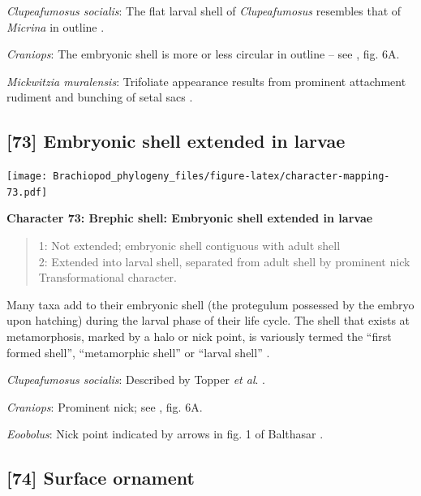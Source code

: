 \documentclass[]{book}
\theoremstyle{definition}
\theoremstyle{definition}
\theoremstyle{definition}
\theoremstyle{remark}
\begin{document}
\emph{Clupeafumosus socialis}: The flat larval shell of
\emph{Clupeafumosus} resembles that of \emph{Micrina} in outline
\citetext{\citealp{Topper2013Reappraisalof}; \citealp[cf.][]{Holmer2011Firstrecord}}.

\emph{Craniops}: The embryonic shell is more or less circular in outline
-- see \citet{Freeman1999Changesin}, fig. 6A.

\emph{Mickwitzia muralensis}: Trifoliate appearance results from
prominent attachment rudiment and bunching of setal sacs
\citep{Balthasar2009Thebrachiopod}.

\hypertarget{embryonic-shell-extended-in-larvae}{%
\subsection*{{[}73{]} Embryonic shell extended in
larvae}\label{embryonic-shell-extended-in-larvae}}

\texttt{[image: Brachiopod\_phylogeny\_files/figure-latex/character-mapping-73.pdf]}

\textbf{Character 73: Brephic shell: Embryonic shell extended in larvae}

\begin{quote}
1: Not extended; embryonic shell contiguous with adult shell\\
2: Extended into larval shell, separated from adult shell by prominent
nick\\
Transformational character.
\end{quote}

Many taxa add to their embryonic shell (the protegulum possessed by the
embryo upon hatching) during the larval phase of their life cycle. The
shell that exists at metamorphosis, marked by a halo or nick point, is
variously termed the ``first formed shell'', ``metamorphic shell'' or
``larval shell'' \citep{Bassett2017Earliestontogeny}.

\emph{Clupeafumosus socialis}: Described by Topper \emph{et al}.
\citeyearpar{Topper2013Reappraisalof}.

\emph{Craniops}: Prominent nick; see \citet{Freeman1999Changesin}, fig.
6A.

\emph{Eoobolus}: Nick point indicated by arrows in fig. 1 of Balthasar
\citeyearpar{Balthasar2009Thebrachiopod}.

\hypertarget{surface-ornament}{%
\subsection*{{[}74{]} Surface ornament}\label{surface-ornament}}
\end{document}
